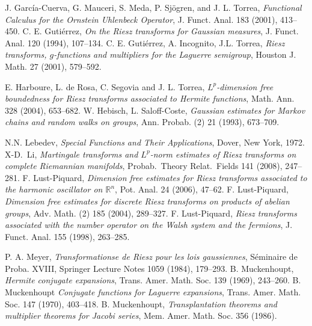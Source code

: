 \documentclass[leqno,12pt]{amsart}
\theoremstyle{definition}
\theoremstyle{remark}
\begin{document}
\begin{thebibliography}{16}
 J. Garc\'ia-Cuerva, G. Mauceri, S. Meda, P. Sj\"{o}gren, and J. L. Torrea, \textit{Functional Calculus for the Ornstein Uhlenbeck Operator}, J. Funct. Anal. 183 (2001), 413--450.
C{.} E{.} Guti\'errez,
\emph{On the Riesz transforms for Gaussian measures},
J{.} Funct{.} Anal{.} 120 (1994), 107--134.
C{.} E{.} Guti\'errez, A{.} Incognito, J{.}L{.} Torrea,
\emph{Riesz transforms, $g$-functions and multipliers for the Laguerre semigroup},
Houston J{.} Math{.} 27 (2001), 579--592.

E{.} Harboure, L{.} de Rosa, C{.} Segovia and J{.} L{.} Torrea,
\emph{$L^p$-dimension free boundedness for Riesz transforms associated to Hermite functions},
Math{.} Ann{.} 328 (2004), 653--682.
 W. Hebisch, L. Saloff-Coste, \textit{Gaussian estimates for Markov chains and random walks on groups},
Ann. Probab. (2) 21 (1993), 673--709.

 N.N. Lebedev, {\it Special Functions and Their Applications}, Dover, New York, 1972.
 X-D.\ Li, \textit{Martingale transforms and $L^p$-norm estimates of Riesz
transforms on complete Riemannian manifolds}, Probab.\ Theory Relat.\ Fields 141 (2008), 247--281.
F{.} Lust-Piquard,
\emph{Dimension free estimates for Riesz transforms associated to the harmonic oscillator on $\mathbb R^n$},
Pot{.} Anal{.} 24 (2006), 47--62.
 F. Lust-Piquard, \textit{Dimension free estimates for discrete Riesz transforms on products of abelian groups}, Adv. Math. (2) 185 (2004), 289--327.
 F. Lust-Piquard, \textit{Riesz transforms associated with the number operator on the Walsh system and the
fermions}, J. Funct. Anal. 155 (1998), 263--285.

 P. A. Meyer, \textit{Transformationse de Riesz pour les lois gaussiennes}, S\'eminaire de Proba. XVIII, Springer Lecture Notes 1059 (1984), 179--293.
 B. Muckenhoupt, \textit{Hermite conjugate expansions}, Trans. Amer. Math. Soc. 139 (1969), 243--260.
 B. Muckenhoupt \textit{Conjugate functions for Laguerre expansions}, Trans. Amer. Math. Soc. 147 (1970), 403--418.
 B. Muckenhoupt, \textit{Transplantation theorems and multiplier theorems for Jacobi series}, Mem. Amer. Math. Soc. 356 (1986).


\end{thebibliography}
\end{document}
